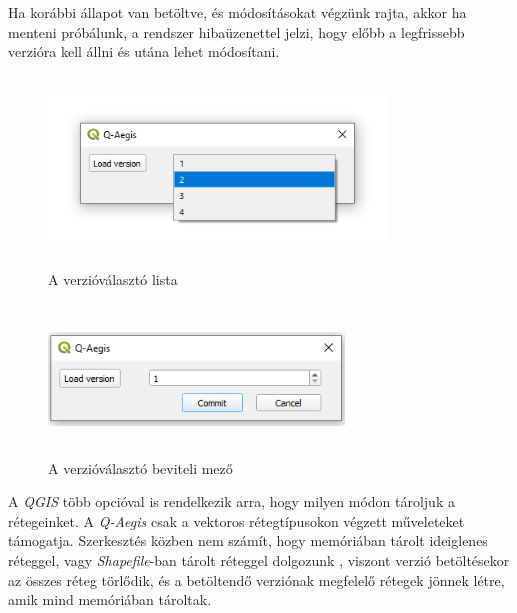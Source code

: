 Ha korábbi állapot van betöltve, és módosításokat végzünk rajta, akkor ha menteni próbálunk, a rendszer hibaüzenettel jelzi, hogy előbb a legfrissebb verzióra kell állni és utána lehet módosítani.
\begin{figure}[H]
	\centering
	\includegraphics[width=0.8\textwidth,height=190px]{images/version_combobox.png}
	\caption{A verzióválasztó lista}
	\label{fig:picture-4}
\end{figure}
\begin{figure}[H]
	\centering
	\includegraphics[width=0.7\textwidth,height=150px]{images/version_spinner.png}
	\caption{A verzióválasztó beviteli mező}
	\label{fig:picture-5}
\end{figure}

\begin{note}
A \emph{QGIS} több opcióval is rendelkezik arra, hogy milyen módon tároljuk a rétegeinket. A \emph{Q-Aegis} csak a vektoros rétegtípusokon végzett műveleteket támogatja. Szerkesztés közben nem számít, hogy memóriában tárolt ideiglenes réteggel, vagy \emph{Shapefile}-ban tárolt réteggel dolgozunk , viszont verzió betöltésekor az összes réteg törlődik, és a betöltendő verziónak megfelelő rétegek jönnek létre, amik mind memóriában tároltak.
\end{note}

